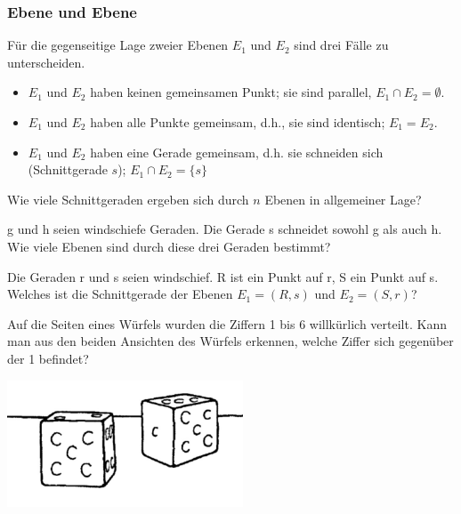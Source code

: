 \documentclass[%
11pt,%
twoside,%
titlepage,%
a4page,%
german,%
headsepline%
]{scrartcl}
\begin{document}
\subsubsection{Ebene und Ebene}
F\"ur die gegenseitige Lage zweier Ebenen $E_1$ und $E_2$ sind drei F\"alle zu unterscheiden.
\begin{itemize}
\item $E_1$ und $E_2$ haben keinen gemeinsamen Punkt; sie sind parallel, $E_1\cap E_2=\emptyset$.
\item $E_1$ und $E_2$ haben alle Punkte gemeinsam, d.h., sie sind identisch; $E_1=E_2$.
\item $E_1$ und $E_2$ haben eine Gerade gemeinsam, d.h. sie schneiden sich (Schnittgerade $s$); $E_1\cap E_2=\{s\}$
\end{itemize}

\begin{ueb}
Wie viele Schnittgeraden ergeben sich durch $n$ Ebenen in allgemeiner Lage?
\end{ueb}
\begin{ueb}
g und h seien windschiefe Geraden. Die Gerade s schneidet sowohl g als auch h. Wie viele Ebenen sind durch diese drei Geraden bestimmt?
\end{ueb}
\begin{ueb}
Die Geraden r und s seien windschief. R ist ein Punkt auf r, S ein Punkt auf s. Welches ist die Schnittgerade der Ebenen $E_1=(R,s)$ und $E_2=(S,r)$?
\end{ueb}

\begin{ueb}
Auf die Seiten eines W\"urfels wurden die Ziffern 1 bis 6 willk\"urlich verteilt. Kann man aus den beiden Ansichten des W\"urfels erkennen, welche Ziffer sich gegen\"uber der 1 befindet?
\begin{center}
\includegraphics[width=7cm]{pictures/wuerfel}
\end{center}
\end{ueb}
\end{document}
